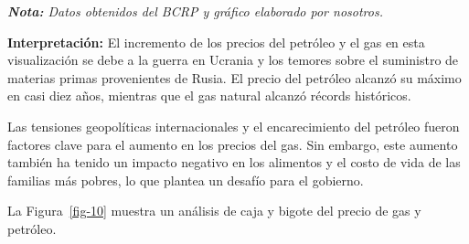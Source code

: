 \documentclass[
  a4paper,
]{article}
\begin{document}
\emph{\textbf{Nota:} Datos obtenidos del BCRP y gráfico elaborado por
nosotros.}

\textbf{Interpretación:} El incremento de los precios del petróleo y el
gas en esta visualización se debe a la guerra en Ucrania y los temores
sobre el suministro de materias primas provenientes de Rusia. El precio
del petróleo alcanzó su máximo en casi diez años, mientras que el gas
natural alcanzó récords históricos.

Las tensiones geopolíticas internacionales y el encarecimiento del
petróleo fueron factores clave para el aumento en los precios del gas.
Sin embargo, este aumento también ha tenido un impacto negativo en los
alimentos y el costo de vida de las familias más pobres, lo que plantea
un desafío para el gobierno.

La Figura~\ref{fig-10} muestra un análisis de caja y bigote del precio
de gas y petróleo.
\end{document}
